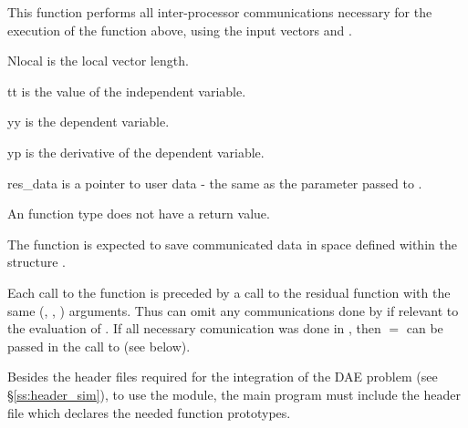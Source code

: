 {
  This function performs all inter-processor communications necessary 
  for the execution of the  function above, using the input 
  vectors  and .
}
{
  \begin{args}
  \item[Nlocal] 
    is the local vector length.
  \item[tt]
    is the value of the independent variable.
  \item[yy]
    is the dependent variable. 
  \item[yp]
    is the derivative of the dependent variable. 
  \item[res\_data]
    is a pointer to user data - the same as the       
    parameter passed to .  
  \end{args}
}
{
  An  function type does not have a return value.
}
{
  The  function is expected to save communicated data in space defined
  within the structure . 

  Each call to the  function is preceded by a call to the residual
  function  with the same (, , ) arguments.  
  Thus  can omit 
  any communications done by  if relevant to the 
  evaluation of .  
  If all necessary comunication was done in , then  $=$ 
  can be passed in the call to  (see below).

}


Besides the header files required for the integration of the DAE problem
(see \S\ref{ss:header_sim}),  to use the {\idabbdpre} module, the main program 
must include the header file  which declares the needed
function prototypes.

